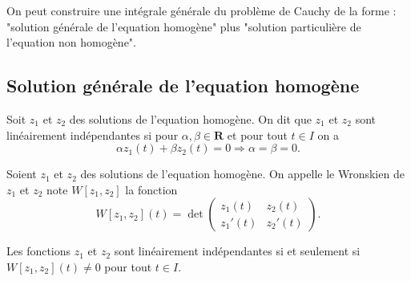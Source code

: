 
On peut construire une intégrale générale du problème de Cauchy de la forme : "solution générale de l'equation homogène" plus "solution particulière de l'equation non homogène".
\subsection{Solution générale de l'equation homogène}
\begin{definition}
Soit $z_{1}$ et $z_{2}$ des solutions de l'equation homogène. On dit que $z_{1}$ et $z_{2}$ sont linéairement indépendantes si pour $\alpha,\beta \in \mathbf{R}$ et pour tout $t\in I$ on a
$$
\alpha z_{1}(t)+\beta z_{2}(t)=0\Rightarrow \alpha=\beta=0.
$$
\end{definition}
\begin{definition}
Soient $z_{1}$ et $z_{2}$ des solutions de l'equation homogène. On appelle le Wronskien de $z_{1}$ et $z_{2}$ note $W[z_{1},z_{2}]$ la fonction 
$$
W[z_{1},z_{2}](t)=\det \begin{pmatrix}
z_{1}(t) & z_{2}(t) \\
z_{1}'(t) & z_{2}'(t)
\end{pmatrix}.
$$
\end{definition}
\begin{theorem}
Les fonctions $z_{1}$ et $z_{2}$ sont linéairement indépendantes si et seulement si $W[z_{1},z_{2}](t)\neq 0$ pour tout $t\in I$.
\end{theorem}
